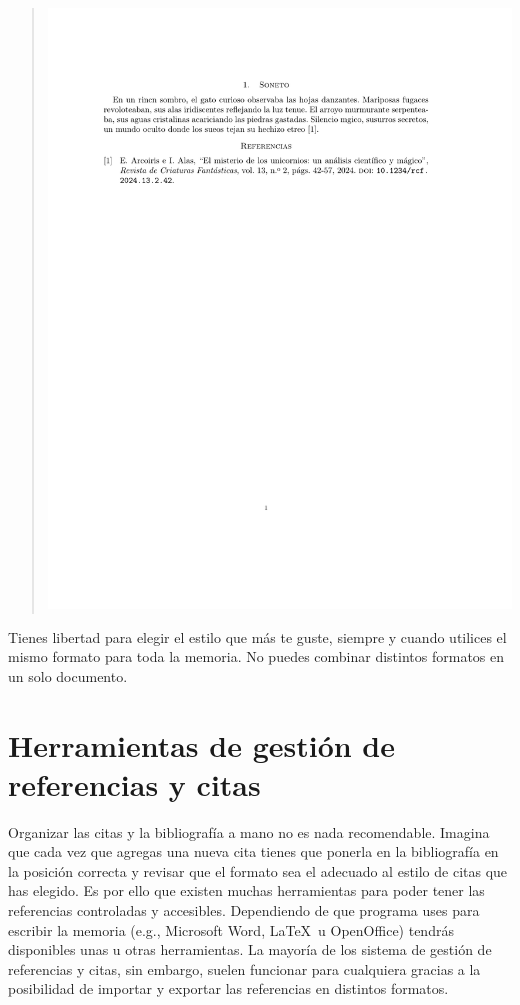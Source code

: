 \begin{naranja}
\begin{itemize}
\begin{quote}
        \includegraphics[scale=0.6, trim={2cm 19cm 3cm 3cm}, clip]{images/ieee.pdf}
    \end{quote}
\end{itemize}
\end{naranja}
Tienes libertad para elegir el estilo que más te guste, siempre y cuando utilices el mismo formato para toda la memoria. No puedes combinar distintos formatos en un solo documento.

\section{Herramientas de gestión de referencias y citas}

Organizar las citas y la bibliografía a mano no es nada recomendable. Imagina que cada vez que agregas una nueva cita tienes que ponerla en la bibliografía en la posición correcta y revisar que el formato sea el adecuado al estilo de citas que has elegido. Es por ello que existen muchas herramientas para poder tener las referencias controladas y accesibles. Dependiendo de que programa uses para escribir la memoria (e.g., Microsoft Word\texttrademark, \LaTeX\ u OpenOffice) tendrás disponibles unas u otras herramientas. La mayoría de los sistema de gestión de referencias y citas, sin embargo, suelen funcionar para cualquiera gracias a la posibilidad de importar y exportar las referencias en distintos formatos.

